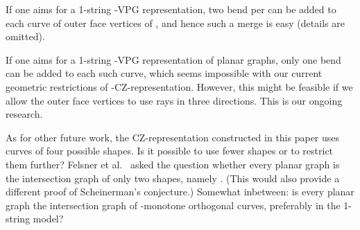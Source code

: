 \documentclass{article}
\renewcommand{\int}[1]{}
\begin{document}
If one aims for a 1-string -VPG representation, two bend per
can be added to each curve of outer face vertices of , and hence 
such a merge is easy (details are omitted).

If one aims for a 1-string -VPG representation of planar
graphs, only one bend can be added to each such curve, 
which seems impossible with our current 
geometric restrictions of \int{F}-CZ-representation. 
However, this might be feasible
if we allow the outer face vertices 
to use rays in three directions. This is our ongoing research.


\medskip
As for other future work,
the CZ-representation constructed in this paper uses curves of four possible shapes.
Is it possible to use fewer shapes or to restrict them further?  
Felsner et al.~\cite{cit:mfcs} asked the question whether every planar
graph is the intersection graph of only two shapes, namely .
(This would also provide a different proof of Scheinerman's conjecture.)
Somewhat inbetween: is every planar graph the intersection graph of
-monotone orthogonal curves, preferably in the 1-string model?


{}

\end{document}
